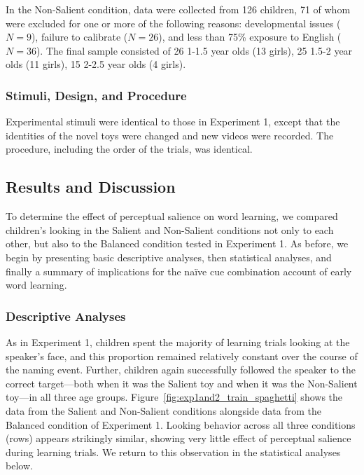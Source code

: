 \documentclass[man,floatsintext]{apa6}
\begin{document}
In the Non-Salient condition, data were collected from 126 children, 71 of whom were excluded for one or more of the following reasons: developmental issues ($N= 9$), failure to calibrate ($N=26$), and less than 75\% exposure to English ($N=36$). The final sample consisted of 26 1-1.5 year olds (13 girls), 25 1.5-2 year olds (11 girls), 15 2-2.5 year olds (4 girls).

\subsubsection{Stimuli, Design, and Procedure}

Experimental stimuli were identical to those in Experiment 1, except that the identities of the novel toys were changed and new videos were recorded. The procedure, including the order of the trials, was identical.

\subsection{Results and Discussion}

To determine the effect of perceptual salience on word learning, we compared children's looking in the Salient and Non-Salient conditions not only to each other, but also to the Balanced condition tested in Experiment 1. As before, we begin by presenting basic descriptive analyses, then statistical analyses, and finally a summary of implications for the na\"{i}ve cue combination account of early word learning.

\subsubsection{Descriptive Analyses}

As in Experiment 1, children spent the majority of learning trials looking at the speaker's face, and this proportion remained relatively constant over the course of the naming event. Further, children again successfully followed the speaker to the correct target---both when it was the Salient toy and when it was the Non-Salient toy---in all three age groups. Figure~\ref{fig:exp1and2_train_spaghetti} shows the data from the Salient and Non-Salient conditions alongside data from the Balanced condition of Experiment 1. Looking behavior across all three conditions (rows) appears strikingly similar, showing very little effect of perceptual salience during learning trials. We return to this observation in the statistical analyses below.
\end{document}
